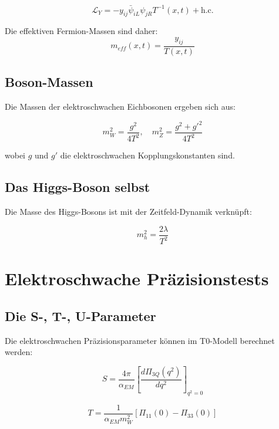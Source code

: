 \documentclass[12pt,a4paper]{report}
\begin{document}
\begin{equation}
	\mathcal{L}_Y = -y_{ij} \bar{\psi}_{iL} \psi_{jR} T^{-1}(x,t) + \text{h.c.}
\end{equation}

Die effektiven Fermion-Massen sind daher:
\begin{equation}
	m_{eff}(x,t) = \frac{y_{ij}}{T(x,t)}
\end{equation}

\subsection{Boson-Massen}

Die Massen der elektroschwachen Eichbosonen ergeben sich aus:

\begin{equation}
	m_W^2 = \frac{g^2}{4T^2}, \quad m_Z^2 = \frac{g^2 + g'^2}{4T^2}
\end{equation}

wobei $g$ und $g'$ die elektroschwachen Kopplungskonstanten sind.

\subsection{Das Higgs-Boson selbst}

Die Masse des Higgs-Bosons ist mit der Zeitfeld-Dynamik verknüpft:

\begin{equation}
	m_h^2 = \frac{2\lambda}{T^2}
\end{equation}

\section{Elektroschwache Präzisionstests}

\subsection{Die S-, T-, U-Parameter}

Die elektroschwachen Präzisionsparameter können im T0-Modell berechnet werden:

\begin{equation}
	S = \frac{4\pi}{\alpha_{EM}}\left[\frac{d\Pi_{3Q}(q^2)}{dq^2}\right]_{q^2=0}
\end{equation}

\begin{equation}
	T = \frac{1}{\alpha_{EM}m_W^2}[\Pi_{11}(0) - \Pi_{33}(0)]
\end{equation}
\end{document}
